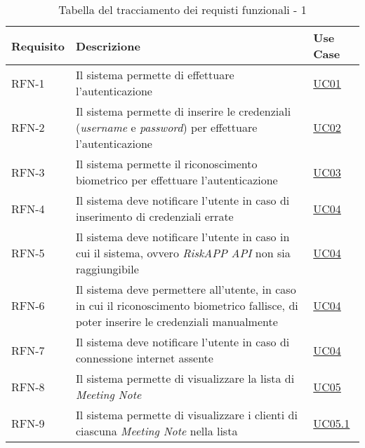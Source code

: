 \begin{table}%
\caption{Tabella del tracciamento dei requisti funzionali - 1}
\label{tab:requisiti-funzionali-1}
\begin{tabularx}{\textwidth}{lXl}
\hline\hline
\textbf{Requisito} & \textbf{Descrizione} & \textbf{Use Case}\\
\hline
RFN-1 \label{RFN-1} & Il sistema permette di effettuare l'autenticazione & \hyperref[UC01]{UC01} \\
\hline
RFN-2 \label{RFN-2} & Il sistema permette di inserire le credenziali (\emph{username} e \emph{password}) per effettuare l'autenticazione & \hyperref[UC02]{UC02} \\
\hline
RFN-3 \label{RFN-3} & Il sistema permette il riconoscimento biometrico per effettuare l'autenticazione & \hyperref[UC03]{UC03} \\
\hline
RFN-4 \label{RFN-4} & Il sistema deve notificare l'utente in caso di inserimento di credenziali errate & \hyperref[UC04]{UC04} \\ %
\hline
RFN-5 \label{RFN-5} & Il sistema deve notificare l'utente in caso in cui il sistema, ovvero \emph{RiskAPP API} non sia raggiungibile & \hyperref[UC04]{UC04} \\ %
\hline
RFN-6 \label{RFN-6} & Il sistema deve permettere all'utente, in caso in cui il riconoscimento biometrico fallisce, di poter inserire le credenziali manualmente & \hyperref[UC04]{UC04} \\
\hline
RFN-7 \label{RFN-7} & Il sistema deve notificare l'utente in caso di connessione internet assente & \hyperref[UC04]{UC04} \\ %
\hline
RFN-8 \label{RFN-8} & Il sistema permette di visualizzare la lista di \emph{Meeting Note} & \hyperref[UC05]{UC05} \\
\hline
RFN-9 \label{RFN-9} & Il sistema permette di visualizzare i clienti di ciascuna \emph{Meeting Note} nella lista & \hyperref[UC05.1]{UC05.1} \\

\end{tabularx}
\end{table}
